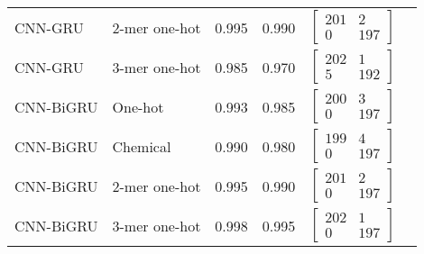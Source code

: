 \begin{longtable}{llllll}
    CNN-GRU & 2-mer one-hot & 0.995 & 0.990 &
    $\begin{bmatrix}
        201 & 2\\ 
        0 & 197
    \end{bmatrix}$
    \\

    CNN-GRU & 3-mer one-hot & 0.985 & 0.970 &
    $\begin{bmatrix}
        202 & 1\\ 
        5 & 192
    \end{bmatrix}$
    \\\midrule


    CNN-BiGRU & One-hot & 0.993 & 0.985 &
    $\begin{bmatrix}
        200 & 3\\ 
        0 & 197
    \end{bmatrix}$
    \\

    CNN-BiGRU & Chemical & 0.990 & 0.980 &
    $\begin{bmatrix}
        199 & 4\\ 
        0 & 197
    \end{bmatrix}$
    \\

    CNN-BiGRU & 2-mer one-hot & 0.995 & 0.990 &
    $\begin{bmatrix}
        201 & 2\\ 
        0 & 197
    \end{bmatrix}$
    \\

    CNN-BiGRU & 3-mer one-hot & 0.998 & 0.995 &
    $\begin{bmatrix}
        202 & 1\\ 
        0 & 197
    \end{bmatrix}$
    \\
    
	\bottomrule
\end{longtable}
